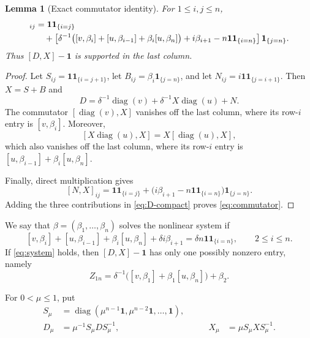 \documentclass[11pt]{amsart}
\numberwithin{equation}{section}
\newtheorem{lemma}[lemma]{Lemma}
\theoremstyle{remark}
\newcommand{\one}{\mathbf 1}
\newcommand{\ind}[1]{\mathbf 1_{\{#1\}}}
\newcommand{\diag}{\operatorname{diag}}
\begin{document}
\begin{lemma}[Exact commutator identity]\label{lem:commutator}
For $1\leq i,j\leq n$,
\begin{align}
 [D,X]_{ij}
 &=\one\ind{i=j}
 \notag\\
 &\quad+
 \left[
 \delta^{-1}\bigl([v,\beta_i]+[u,\beta_{i-1}]
 +\beta_i[u,\beta_n]\bigr)
 +i\beta_{i+1}-n\one\ind{i=n}
 \right]\ind{j=n}.
 \label{eq:commutator}
\end{align}
Thus $[D,X]-\one$ is supported in the last column.
\end{lemma}

\begin{proof}
Let $S_{ij}=\one\ind{i=j+1}$, let
$B_{ij}=\beta_i\ind{j=n}$, and let
$N_{ij}=i\one\ind{j=i+1}$.  Then $X=S+B$ and
\begin{equation}\label{eq:D-compact}
 D=\delta^{-1}\diag(v)+\delta^{-1}X\diag(u)+N.
\end{equation}
The commutator $[\diag(v),X]$ vanishes off the last column, where its row-$i$
entry is $[v,\beta_i]$.  Moreover,
\[
 [X\diag(u),X]=X[\diag(u),X],
\]
which also vanishes off the last column, where its row-$i$ entry is
$[u,\beta_{i-1}]+\beta_i[u,\beta_n]$.

Finally, direct multiplication gives
\[
 [N,X]_{ij}
 =\one\ind{i=j}
 +\bigl(i\beta_{i+1}-n\one\ind{i=n}\bigr)\ind{j=n}.
\]
Adding the three contributions in \eqref{eq:D-compact} proves
\eqref{eq:commutator}.
\end{proof}

We say that $\beta=(\beta_1,\ldots,\beta_n)$ solves the nonlinear system if
\begin{equation}\label{eq:system}
 [v,\beta_i]+[u,\beta_{i-1}]
 +\beta_i[u,\beta_n]+\delta i\beta_{i+1}
 =\delta n\one\ind{i=n},
 \qquad 2\leq i\leq n.
\end{equation}
If \eqref{eq:system} holds, then $[D,X]-\one$ has only one
possibly nonzero entry, namely
\begin{equation}\label{eq:single-corner}
 Z_{1n}=\delta^{-1}\bigl([v,\beta_1]+\beta_1[u,\beta_n]\bigr)+\beta_2.
\end{equation}

For $0<\mu\leq1$, put
\begin{equation}\label{eq:Smu}
 \begin{aligned}
 S_\mu&=\diag(\mu^{n-1}\one,\mu^{n-2}\one,\ldots,\one),\\
 D_\mu&=\mu^{-1}S_\mu D S_\mu^{-1},
 &\qquad
 X_\mu&=\mu S_\mu X S_\mu^{-1}.
 \end{aligned}
\end{equation}
\end{document}
